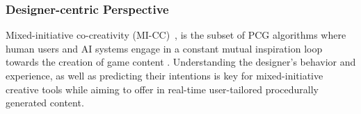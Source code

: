 






\subsubsection{Designer-centric Perspective}

Mixed-initiative co-creativity (MI-CC)~, is the subset of PCG algorithms where human users and AI systems engage in a constant mutual inspiration loop towards the creation of game content . Understanding the designer's behavior and experience, as well as predicting their intentions is key for mixed-initiative creative tools while aiming to offer in real-time user-tailored procedurally generated content. 

